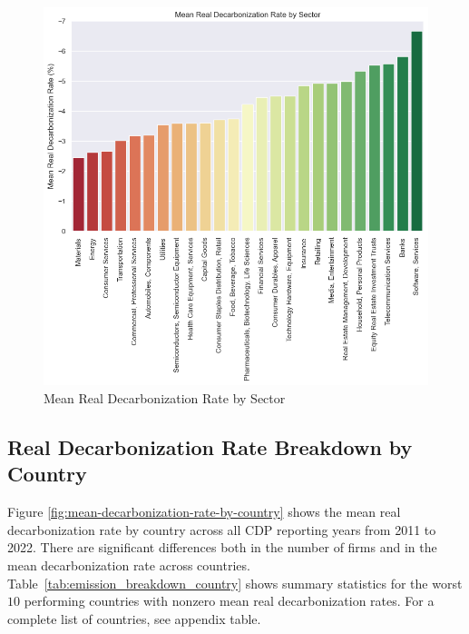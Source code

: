 \begin{figure}[H]
    \begin{center}
    \includegraphics[width=5in]{figures/mean_decarbonization_rate_by_sector.png}
    \caption{Mean Real Decarbonization Rate by Sector}
    \label{fig:mean-decarbonization-rate-by-sector}
    \end{center}
\end{figure}


 

\subsection{Real Decarbonization Rate Breakdown by Country}

Figure \ref{fig:mean-decarbonization-rate-by-country} shows the mean real decarbonization rate by country across all CDP reporting years from 2011 to 2022. There are significant differences both in the number of firms and in the mean decarbonization rate across countries. Table~\ref{tab:emission_breakdown_country} shows summary statistics for the worst $10$ performing countries with nonzero mean real decarbonization rates. For a complete list of countries, see appendix table.


